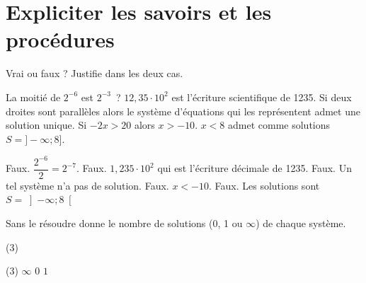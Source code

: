 \documentclass[a4paper, 12pt, parskip=half-, twoside=semi]{scrartcl}
\begin{document}
\section*{ Expliciter les savoirs et les procédures}
\begin{connaitre}[points=5]
    Vrai ou faux ? Justifie dans les deux cas.
    \begin{tasks}
        \task La moitié de \(2^{-6}\) est \(2^{-3}\)~?
        \task $12,35\cdot 10^2$ est l'écriture scientifique de \num{1235}.
        \task Si deux droites sont parallèles alors le système d'équations qui les représentent admet une solution unique.
        \task Si $-2x > 20$ alors $x > -10$.
        \task $x<8$ admet comme solutions $S=]-\infty; 8]$.
    \end{tasks}
\end{connaitre}
\begin{solconnaitre}
    \begin{tasks}
        \task Faux. $\dfrac{2^{-6}}{2} = 2^{-7}$.
        \task Faux. $1, 235 \cdot 10^2$ qui est l'écriture décimale de \num{1235}.
        \task Faux. Un tel système n'a pas de solution.
        \task Faux. $x<-10$.
        \task Faux. Les solutions sont $S=\left]-\infty; 8\right[$
    \end{tasks}
\end{solconnaitre}
\begin{connaitre}[points=3]
    Sans le résoudre donne le nombre de solutions (0, 1 ou $\infty$) de chaque système.
    \begin{tasks}(3)
        \task {}
        \task {}
        \task {}
    \end{tasks}
\end{connaitre}
\begin{solconnaitre}
    \begin{tasks}(3)
        \task \(\infty\)
        \task \(0\)
        \task \(1\)
    \end{tasks}
\end{solconnaitre}
\end{document}
